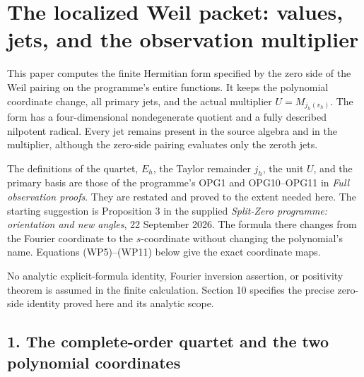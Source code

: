 \documentclass[
  10pt,
  a4paper,
]{article}
\begin{document}
\section{The localized Weil packet: values, jets, and the observation
multiplier}\label{the-localized-weil-packet-values-jets-and-the-observation-multiplier}

This paper computes the finite Hermitian form specified by the zero side
of the Weil pairing on the programme's entire functions. It keeps the
polynomial coordinate change, all primary jets, and the actual
multiplier \(U=M_{j_h(v_h)}\). The form has a four-dimensional
nondegenerate quotient and a fully described nilpotent radical. Every
jet remains present in the source algebra and in the multiplier,
although the zero-side pairing evaluates only the zeroth jets.

The definitions of the quartet, \(E_h\), the Taylor remainder \(j_h\),
the unit \(U\), and the primary basis are those of the programme's OPG1
and OPG10--OPG11 in \emph{Full observation proofs}. They are restated
and proved to the extent needed here. The starting suggestion is
Proposition 3 in the supplied \emph{Split-Zero programme: orientation
and new angles}, 22 September 2026. The formula there changes from the
Fourier coordinate to the \(s\)-coordinate without changing the
polynomial's name. Equations (WP5)--(WP11) below give the exact
coordinate maps.

No analytic explicit-formula identity, Fourier inversion assertion, or
positivity theorem is assumed in the finite calculation. Section 10
specifies the precise zero-side identity proved here and its analytic
scope.

\subsection{1. The complete-order quartet and the two polynomial
coordinates}\label{the-complete-order-quartet-and-the-two-polynomial-coordinates}
\end{document}
